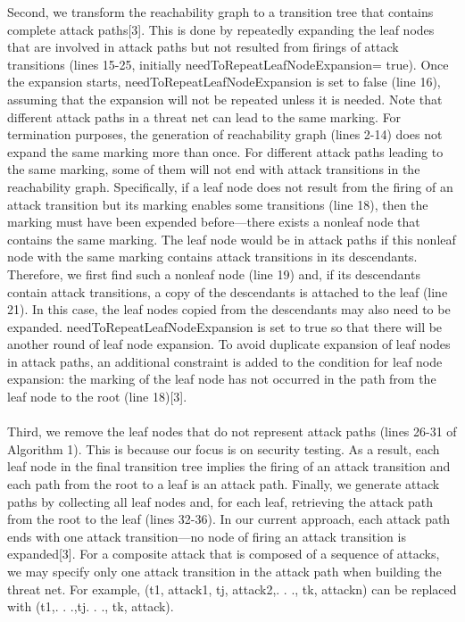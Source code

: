 Second, we transform the reachability graph to a
transition tree that contains complete attack paths[3]. This is
done by repeatedly expanding the leaf nodes that are
involved in attack paths but not resulted from firings of
attack transitions (lines 15-25, initially needToRepeatLeafNodeExpansion= true). Once the expansion starts, needToRepeatLeafNodeExpansion is set to false (line 16), assuming that the expansion will not be repeated unless it is needed. Note
that different attack paths in a threat net can lead to the same marking. For termination purposes, the generation of reachability graph (lines 2-14) does not expand the same marking more than once. For different attack paths leading
to the same marking, some of them will not end with attack transitions in the reachability graph. Specifically, if a leaf node does not result from the firing of an attack transition but its marking enables some transitions (line 18), then the
marking must have been expended before—there exists a nonleaf node that contains the same marking. The leaf node would be in attack paths if this nonleaf node with the same marking contains attack transitions in its descendants.
\\Therefore, we first find such a nonleaf node (line 19) and, if
its descendants contain attack transitions, a copy of the
descendants is attached to the leaf (line 21). In this case,
the leaf nodes copied from the descendants may also need
to be expanded. needToRepeatLeafNodeExpansion is set to true
so that there will be another round of leaf node expansion.
To avoid duplicate expansion of leaf nodes in attack paths,
an additional constraint is added to the condition for leaf
node expansion: the marking of the leaf node has not
occurred in the path from the leaf node to the root (line 18)[3].
\paragraph{}
Third, we remove the leaf nodes that do not represent
attack paths (lines 26-31 of Algorithm 1). This is because our
focus is on security testing. As a result, each leaf node in the
final transition tree implies the firing of an attack transition
and each path from the root to a leaf is an attack path.
Finally, we generate attack paths by collecting all leaf nodes
and, for each leaf, retrieving the attack path from the root to
the leaf (lines 32-36). In our current approach, each attack
path ends with one attack transition—no node of firing an
attack transition is expanded[3]. For a composite attack that is
composed of a sequence of attacks, we may specify only one
attack transition in the attack path when building the threat
net. For example, (t1, attack1, tj, attack2,. . ., tk, attackn)
can be replaced with (t1,. . .,tj. . ., tk, attack).

